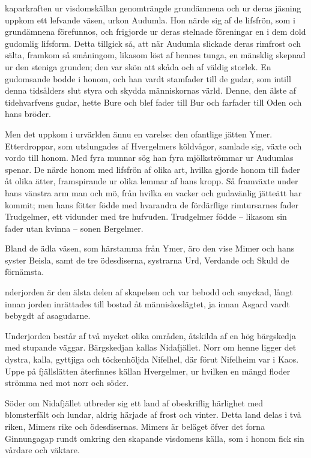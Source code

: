 
\dropcapS kaparkraften ur visdomskällan genomträngde grundämnena och ur deras
jäsning uppkom ett lefvande väsen, urkon Audumla. Hon närde sig af de
lifsfrön, som i grundämnena förefunnos, och frigjorde ur deras stelnade
föreningar en i dem dold gudomlig lifsform. Detta tillgick så, att när
Audumla slickade deras rimfrost och sälta, framkom så småningom, likasom
löst af hennes tunga, en mänsklig skepnad ur den steniga grunden; den
var skön att skåda och af väldig storlek. En gudomsande bodde i honom,
och han vardt stamfader till de gudar, som intill denna tidsålders slut
styra och skydda människornas värld. Denne, den älste af tidehvarfvens
gudar, hette Bure och blef fader till Bur och farfader till Oden och
hans bröder.

Men det uppkom i urvärlden ännu en varelse: den ofantlige jätten Ymer.
Etterdroppar, som utslungades af Hvergelmers köldvågor, samlade sig,
växte och vordo till honom. Med fyra munnar sög han fyra mjölkströmmar
ur Audumlas spenar. De närde honom med lifsfrön af olika art, hvilka
gjorde honom till fader åt olika ätter, framspirande ur olika lemmar af
hans kropp. Så framväxte under hans vänstra arm man och mö, från hvilka
en vacker och gudavänlig jätteätt har kommit; men hans fötter födde med
hvarandra de
fördärflige rimtursarnes fader Trudgelmer, ett vidunder med tre
hufvuden. Trudgelmer födde -- likasom sin fader utan kvinna -- sonen
Bergelmer.

Bland de ädla väsen, som härstamma från Ymer, äro den vise Mimer och
hans syster Beisla, samt de tre ödesdiserna, systrarna Urd, Verdande och
Skuld de förnämsta.


\dropcapU nderjorden är den älsta delen af skapelsen och var bebodd och smyckad,
långt innan jorden inrättades till bostad åt människoslägtet, ja innan
Asgard vardt bebygdt af asagudarne.

Underjorden består af två mycket olika områden, åtskilda af en hög
bärgskedja med stupande väggar. Bärgskedjan kallas Nidafjället. Norr om
henne ligger det dystra, kalla, gyttjiga och töckenhöljda Nifelhel, där
förut Nifelheim var i Kaos. Uppe på fjällslätten återfinnes källan
Hvergelmer, ur hvilken en mängd floder strömma ned mot norr och söder.

Söder om Nidafjället utbreder sig ett land af obeskriflig härlighet med
blomsterfält och lundar, aldrig härjade af frost och vinter. Detta land
delas i två riken, Mimers rike och ödesdisernas. Mimers är beläget öfver
det forna Ginnungagap rundt omkring den skapande visdomens källa, som i
honom fick sin vårdare och väktare.

